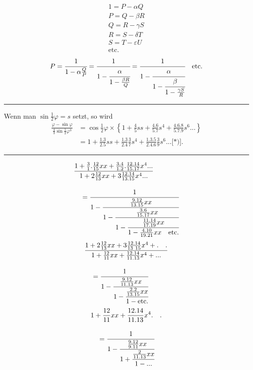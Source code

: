 \[\begin{gathered}
1=P-\alpha Q\\
P=Q-\beta R\\
Q=R-\gamma S\\
R=S-\delta T\\
S=T-\varepsilon U\\
\text{etc.}
\end{gathered}\]
\[P=\cfrac1{1-\alpha\frac QP}
=\cfrac1{1-\cfrac\alpha{1-\frac{\beta R}Q}}
=\cfrac1{1-\cfrac\alpha{1-\cfrac\beta{1-\frac{\gamma S}R}}}\quad\text{etc.}\]
\par\medskip\begin{center}\rule{.2\linewidth}{.4pt}\end{center}
\noindent{\small[S. 55---57]}\par
\par\indent Wenn man $\sin\tfrac12\varphi=s$ setzt, so wird
\[\begin{aligned}
\frac{\varphi-\sin\varphi}{\frac43\sin\frac12\varphi^3}
&=\cos\frac12\varphi\times\left\{1+\frac45ss+\frac{4{.}6}{5{.}7}s^4+\frac{4{.}6{.}8}{5{.}7{.}9}s^6{.}{.}{.}\right\}\\[.6em]
&=1+\frac{1{.}3}{2{.}5}ss+\frac{1{.}3}{2{.}4}\frac37s^4+\frac{1{.}3{.}5}{2{.}4{.}6}\frac39s^6{.}{.}{.}\text{[*)].}
\end{aligned}\]
\par\bigskip\noindent\rule{.25\linewidth}{.4pt}\par\smallskip
{\small\par{}\par}
\clearpage{}
\[\begin{aligned}
&\frac{1+\frac31{.}\frac{12}{15}xx+\frac{3{.}4}{1{.}2}{.}\frac{12{.}14}{15{.}17}x^4{.}{.}{.}}{1+2\frac{12}{13}xx+3\frac{12{.}14}{13{.}15}x^4{.}{.}{.}}\\[.8em]
&\quad=\cfrac1{1-\cfrac{\frac{9{.}12}{13{.}15}xx}{1-\cfrac{\frac{3{.}6}{15{.}17}xx}{1-\cfrac{\frac{11{.}14}{17{.}19}xx}{1-\frac{4{.}10}{19{.}21}xx\quad\text{etc.}}}}}
\end{aligned}\]
\[\begin{aligned}
&\frac{1+2\frac{12}{13}xx+3\frac{12{.}14}{13\ 15}x^4+{.}\quad{.}}{1+\frac{12}{11}xx+\frac{12{.}14}{11{.}13}x^4+{.}{.}{.}}\\[.8em]
&\quad=\cfrac1{1-\cfrac{\frac{9{.}12}{11{.}13}xx}{1-\cfrac{\frac{2{.}2}{13{.}15}xx}{1-\text{etc.}}}}
\end{aligned}\]
\[\begin{aligned}
&1+\frac{12}{11}xx+\frac{12{.}14}{11{.}13}x^4{.}\quad{.}\\[.8em]
&\quad=\cfrac1{1-\cfrac{\frac{9{.}12}{9{.}11}xx}{1+\cfrac{\frac2{11{.}13}xx}{1-{.}{.}{.}}}}
\end{aligned}\]
\clearpage
\endgroup
